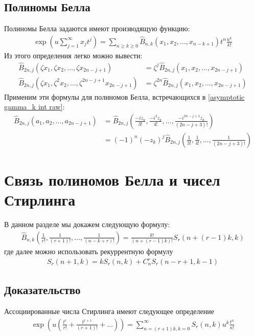 \documentclass[a4paper, 12pt]{article}
\newenvironment{eqw}{\begin{equation} \begin{aligned}}   
    {\end{aligned}    \end{equation}}
\begin{document}
\subsection*{Полиномы Белла}
Полиномы Белла задаются имеют производящую функцию:
\begin{eqw}\label{Bell generating func}
    \exp\left(u \sum\limits_{j=1}^{\infty}x_j t^j\right) = \sum\limits_{n\geq k\geq 0} 
    \hat{B}_{n,k}\left(x_1, x_2, \dots, x_{n-k+1}\right) t^n \frac{u^k}{k!}
\end{eqw}
Из этого определения легко можно вывести:
\begin{eqw}
    \hat{B}_{2n, j}(\zeta x_1, \zeta x_2, \dots, \zeta x_{2n-j+1}) &= \zeta^j \hat{B}_{2n, j}( x_1,  x_2, \dots,  x_{2n-j+1})\\
    \hat{B}_{2n, j}(\zeta x_1, \zeta^2 x_2, \dots, \zeta^{2n-j+1} x_{2n-j+1}) &= \zeta^{2n} \hat{B}_{2n, j}( x_1,  x_2, \dots,  x_{2n-j+1})
\end{eqw}
Применим эти формулы для полиномов Белла, встречающихся в \eqref{asymptotic gamma_k int raw}:
\begin{eqw}\label{Bell simplification}
    \hat{B}_{2n, j}\left(a_1, a_2, \dots, a_{2n-j+1}\right) &= 
    \hat{B}_{2n, j}\left(\frac{-i z_k}{3!}, \frac{-i^2 z_k}{4!}, \dots, \frac{-i^{2n-j+1} z_k}{(2n-j+3)!}\right) \\
    &= (-1)^n(-z_k)^{j}\hat{B}_{2n, j}\left(\frac{1}{3!}, \frac{1}{4!}, \dots, \frac{1}{(2n-j+3)!}\right)
\end{eqw}

\section*{Связь полиномов Белла и чисел Стирлинга}
В данном разделе мы докажем следующую формулу:
\begin{eqw}\label{Bell and Stirling connection}
    \hat{B}_{n, k}\left(\frac{1}{r!}, \frac{1}{(r+1)!}, \dots, \frac{1}{(n-k+r)!}\right) = 
    \frac{k!}{(n+(r-1)k)!}S_{r}(n+(r-1)k, k)
\end{eqw}
где далее можно использовать рекуррентную формулу \cite[~p. 222]{comtet2012advanced}
\begin{eqw}
    S_r(n+1, k) = k S_r(n, k) + C_n^{r} S_r(n-r+1, k-1)
\end{eqw}

\subsection*{Доказательство}
Ассоциированные числа Стирлинга имеют следующее определение \cite[~p. 222]{comtet2012advanced}
\begin{eqw}\label{Stirling generating func}
    \exp\left(u\left(\frac{t^r}{r!}+\frac{t^{r+1}}{\left(r+1\right)!}+\dots\right)\right) = \sum\limits_{n=(r+1)k, k = 0}^{\infty} S_{r}(n, k) u^k \frac{t^n}{n!}
\end{eqw}
\end{document}
